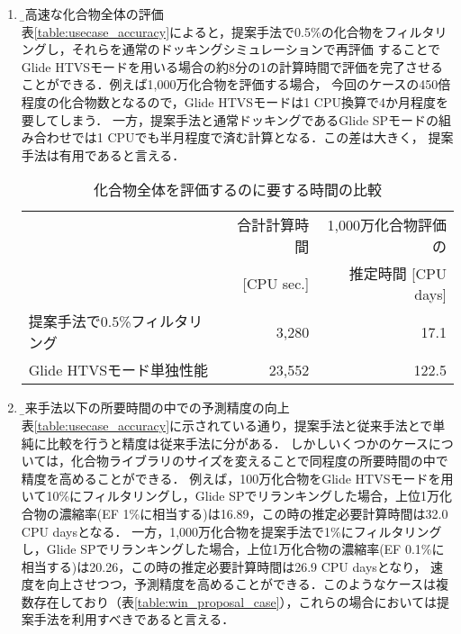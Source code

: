 \begin{enumerate}
\item \b{超高速な化合物全体の評価}\\
	表\ref{table:usecase_accuracy}によると，提案手法で0.5\%の化合物をフィルタリングし，それらを通常のドッキングシミュレーションで再評価
	することでGlide HTVSモードを用いる場合の約8分の1の計算時間で評価を完了させることができる．例えば1,000万化合物を評価する場合，
	今回のケースの450倍程度の化合物数となるので，Glide HTVSモードは1 CPU換算で4か月程度を要してしまう．
	一方，提案手法と通常ドッキングであるGlide SPモードの組み合わせでは1 CPUでも半月程度で済む計算となる．この差は大きく，
	提案手法は有用であると言える．
\begin{table}[htbp] \centering
	\caption{化合物全体を評価するのに要する時間の比較}
	\label{calc_speed_ultrafast}
	\begin{tabular}{l|rr}
	\hline
												&合計計算時間	&1,000万化合物評価の		\\ 
												&[CPU sec.]		&推定時間 [CPU days]		\\ \hline
	提案手法で0.5\%フィルタリング	&3,280				&17.1								\\
	Glide HTVSモード単独性能		&23,552				&122.5								\\ \hline
	\end{tabular}
\end{table}
\item \b{従来手法以下の所要時間の中での予測精度の向上}\\
	表\ref{table:usecase_accuracy}に示されている通り，提案手法と従来手法とで単純に比較を行うと精度は従来手法に分がある．
	しかしいくつかのケースについては，化合物ライブラリのサイズを変えることで同程度の所要時間の中で精度を高めることができる．
	例えば，100万化合物をGlide HTVSモードを用いて10\%にフィルタリングし，Glide SPでリランキングした場合，上位1万化合物の濃縮率(EF 1\%に相当する)は16.89，この時の推定必要計算時間は32.0 CPU daysとなる．
	一方，1,000万化合物を提案手法で1\%にフィルタリングし，Glide SPでリランキングした場合，上位1万化合物の濃縮率(EF 0.1\%に相当する)は20.26，この時の推定必要計算時間は26.9 CPU daysとなり，
	速度を向上させつつ，予測精度を高めることができる．このようなケースは複数存在しており（表\ref{table:win_proposal_case}），これらの場合においては提案手法を利用すべきであると言える．
\end{enumerate}


